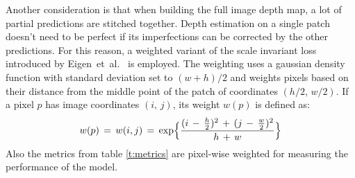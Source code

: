Another consideration is that when building the full image depth map, a lot of partial predictions are stitched together.
Depth estimation on a single patch doesn't need to be perfect if its imperfections can be corrected by the other predictions.
For this reason, a weighted variant of the scale invariant loss introduced by Eigen~et~al.~\cite{Eigen} is employed.
The weighting uses a gaussian density function with standard deviation set to $(w + h) / 2$ and weights pixels based on their distance from the middle point of the patch of coordinates $(h/2, \, w/2)$.
If a pixel $p$ has image coordinates $(i, \, j)$, its weight $w(p)$ is defined as:
\[
    w(p) \, = \, w(i, j) \, = \,
    \text{exp} \Bigl\{
        \frac{
            (i \, - \, \frac{h}{2})^{2} \, + \,
            (j \, - \, \frac{w}{2})^{2}
        }{
            h \, + \, w
        }
    \Bigr\}
\]
Also the metrics from table \ref{t:metrics} are pixel-wise weighted for measuring the performance of the model.

